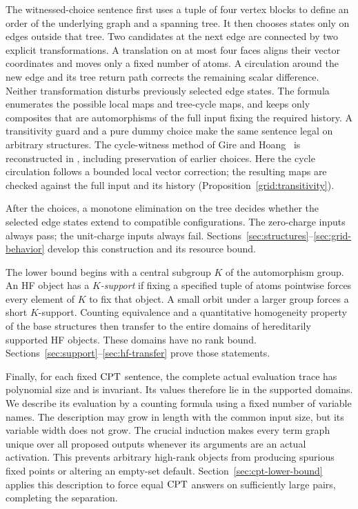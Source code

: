 The witnessed-choice sentence first uses a tuple of four vertex blocks to
define an order of the underlying graph and a spanning tree. It then
chooses states only on edges outside that tree. Two candidates at the next
edge are connected by two explicit transformations. A translation on at
most four faces aligns their vector coordinates and moves only a fixed
number of atoms. A circulation around the new edge and its tree return
path corrects the remaining scalar difference. Neither transformation
disturbs previously selected edge states. The formula enumerates the
possible local maps and tree-cycle maps, and keeps only composites that
are automorphisms of the full input fixing the required history. A
transitivity guard and a pure dummy choice make the same sentence legal
on arbitrary structures.
The cycle-witness method of Gire and Hoang~\cite{gireHoang1998} is
reconstructed in \cite[Section~6]{ls2023}, including preservation of
earlier choices.
Here the cycle circulation follows a bounded local vector correction;
the resulting maps are checked against the full input and its history
(Proposition~\ref{grid:transitivity}).

After the choices, a monotone elimination on the tree decides whether the
selected edge states extend to compatible configurations. The zero-charge
inputs always pass; the unit-charge inputs always fail.
Sections~\ref{sec:structures}--\ref{sec:grid-behavior} develop this
construction and its resource bound.

The lower bound begins with a central subgroup \(K\) of the automorphism
group. An HF object has a \emph{\(K\)-support} if fixing a specified tuple
of atoms pointwise forces every element of \(K\) to fix that object.
A small orbit under a larger group forces a short \(K\)-support.
Counting equivalence and a quantitative homogeneity property of the base
structures then transfer to the entire domains of hereditarily supported
HF objects. These domains have no rank bound.
Sections~\ref{sec:support}--\ref{sec:hf-transfer} prove those statements.

Finally, for each fixed \(\mathrm{CPT}\) sentence, the complete actual evaluation
trace has polynomial size and is invariant. Its values therefore lie in
the supported domains. We describe its evaluation by a counting formula
using a fixed number of variable names. The description may grow in
length with the common input size, but its variable width does not grow.
The crucial induction makes every term graph unique over all proposed
outputs whenever its arguments are an actual activation. This prevents
arbitrary high-rank objects from producing spurious fixed points or
altering an empty-set default. Section~\ref{sec:cpt-lower-bound} applies
this description to force equal \(\mathrm{CPT}\) answers on sufficiently large
pairs, completing the separation.
